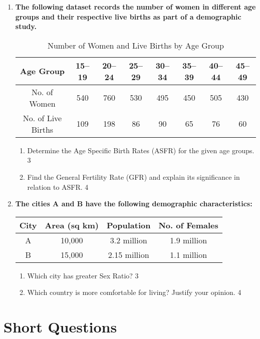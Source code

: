 \documentclass[a4paper,oneside, margin=1.4in]{book}
\begin{document}
\begin{enumerate}
\item
\textbf{The following dataset records the number of women in different age groups and their respective live births as part of a demographic study.} 

\begin{table}[H]
\centering
\begin{tabular}{c|ccccccc}
Age Group & 15--19 & 20--24 & 25--29 & 30--34 & 35--39 & 40--44 & 45--49 \\ \hline
No. of Women & 540 & 760 & 530 & 495 & 450 & 505 & 430 \\
No. of Live Births & 109 & 198 & 86 & 90 & 65 & 76 & 60
\end{tabular}
\caption{Number of Women and Live Births by Age Group}
\end{table}


\begin{enumerate}
    \item
    Determine the Age Specific Birth Rates (ASFR) for the given age groups. \hfill 3

    \item
    Find the General Fertility Rate (GFR) and explain its significance in relation to ASFR. \hfill 4
\end{enumerate}

 \item
	  \textbf{The cities A and B have the following demographic characteristics:} 
  
  \begin{table}[H]
\centering
\begin{tabular}{c|c|c|c}
City & Area (sq km) & Population & No. of Females \\ \hline
A & 10,000 & 3.2 million & 1.9 million \\
B & 15,000 & 2.15 million & 1.1 million
\end{tabular}
\end{table}

  
  \begin{enumerate}
    \item  
	Which city has greater Sex Ratio? \hfill 3
    \item
	Which country is more comfortable  for living? Justify your opinion. \hfill 4
  \end{enumerate}

  
  \end{enumerate}

\section{Short Questions}
\end{document}
